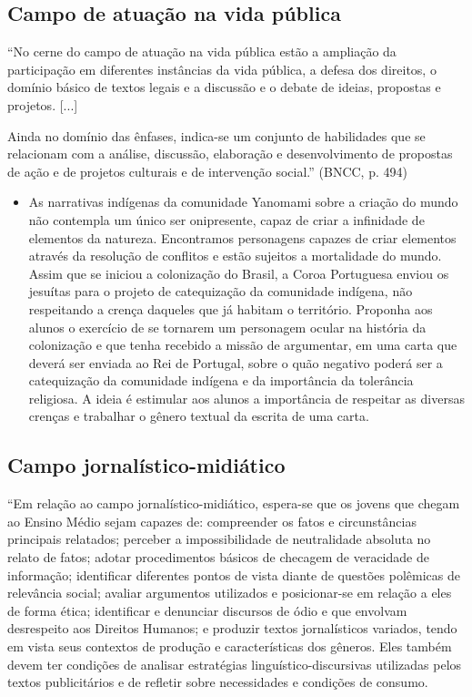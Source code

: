 \documentclass[12pt]{extarticle}
\begin{document}
\subsection{Campo de atuação na vida pública}

``No cerne do campo de atuação na vida pública estão a ampliação da
participação em diferentes instâncias da vida pública, a defesa dos
direitos, o domínio básico de textos legais e a discussão e o debate de
ideias, propostas e projetos. {[}...{]}

Ainda no domínio das ênfases, indica-se um conjunto de habilidades que
se relacionam com a análise, discussão, elaboração e desenvolvimento de
propostas de ação e de projetos culturais e de intervenção social.''
(BNCC, p. 494)

\begin{itemize}
\item
  As narrativas indígenas da comunidade Yanomami sobre a criação do
  mundo não contempla um único ser onipresente, capaz de criar a
  infinidade de elementos da natureza. Encontramos personagens capazes
  de criar elementos através da resolução de conflitos e estão sujeitos
  a mortalidade do mundo. Assim que se iniciou a colonização do Brasil,
  a Coroa Portuguesa enviou os jesuítas para o projeto de catequização
  da comunidade indígena, não respeitando a crença daqueles que já
  habitam o território. Proponha aos alunos o exercício de se tornarem
  um personagem ocular na história da colonização e que tenha recebido a
  missão de argumentar, em uma carta que deverá ser enviada ao Rei de
  Portugal, sobre o quão negativo poderá ser a catequização da
  comunidade indígena e da importância da tolerância religiosa. A ideia
  é estimular aos alunos a importância de respeitar as diversas crenças
  e trabalhar o gênero textual da escrita de uma carta.
\end{itemize}


\subsection{Campo jornalístico-midiático }

``Em relação ao campo jornalístico-midiático, espera-se que os jovens
que chegam ao Ensino Médio sejam capazes de: compreender os fatos e
circunstâncias principais relatados; perceber a impossibilidade de
neutralidade absoluta no relato de fatos; adotar procedimentos básicos
de checagem de veracidade de informação; identificar diferentes pontos
de vista diante de questões polêmicas de relevância social; avaliar
argumentos utilizados e posicionar-se em relação a eles de forma ética;
identificar e denunciar discursos de ódio e que envolvam desrespeito aos
Direitos Humanos; e produzir textos jornalísticos variados, tendo em
vista seus contextos de produção e características dos gêneros. Eles
também devem ter condições de analisar estratégias
linguístico-discursivas utilizadas pelos textos publicitários e de
refletir sobre necessidades e condições de consumo.
\end{document}
